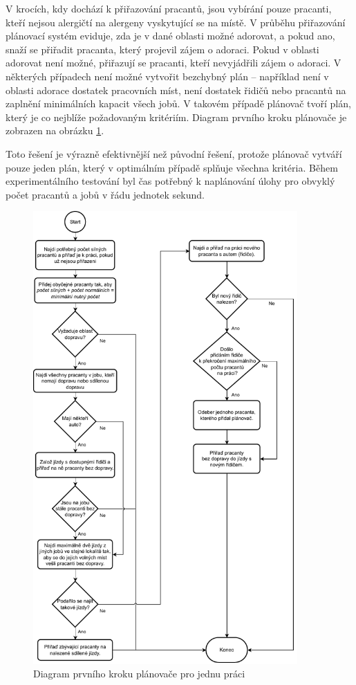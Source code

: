 V krocích, kdy dochází k přiřazování pracantů, jsou vybírání pouze pracanti, kteří nejsou alergičtí na alergeny vyskytující se na místě.
V průběhu přiřazování plánovací systém eviduje, zda je v dané oblasti možné adorovat, a pokud ano, snaží se přiřadit pracanta, který projevil zájem o adoraci.
Pokud v oblasti adorovat není možné, přiřazují se pracanti, kteří nevyjádřili zájem o adoraci.
V některých případech není možné vytvořit bezchybný plán -- například není v oblasti adorace dostatek pracovních míst, není dostatek řidičů nebo pracantů na zaplnění
minimálních kapacit všech jobů. V takovém případě plánovač tvoří plán, který je co nejblíže požadovaným kritériím.
Diagram prvního kroku plánovače je zobrazen na obrázku \ref{fig:planner-diagram}.

Toto řešení je výrazně efektivnější než původní řešení, protože plánovač vytváří pouze jeden plán, který v optimálním případě splňuje všechna kritéria.
Během experimentálního testování byl čas potřebný k naplánování úlohy pro obvyklý počet pracantů a jobů v řádu jednotek sekund.

\begin{figure}[h]
    \centering
    \includegraphics[width=0.9\textwidth]{chapters/images/planner-diagram.pdf}
    \caption{Diagram prvního kroku plánovače pro jednu práci}
    \label{fig:planner-diagram}
\end{figure}


